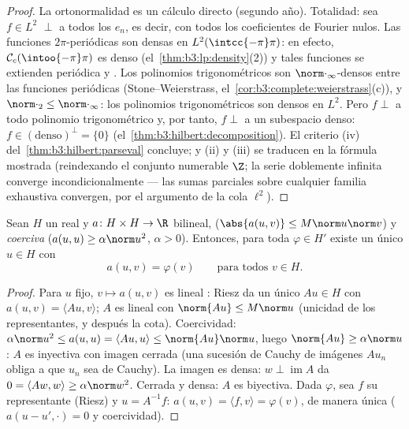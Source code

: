 \begin{proof}
La ortonormalidad es un cálculo directo (segundo año). Totalidad: sea
$f \in L^2$ $\perp$ a todos los $e_n$, es decir, con todos los
coeficientes de Fourier nulos. Las funciones $2\pi$-periódicas
 son densas en
$L^2(\intcc{-\pi}\pi)$: en efecto, $\mathcal
C_c(\intoo{-\pi}\pi)$ es denso (el~\cref{thm:b3:lp:density}(2)) y tales
funciones se extienden periódica y
. Los polinomios
trigonométricos son $\norm\cdot_\infty$-densos entre las funciones
periódicas 
(Stone--Weierstrass, el~\cref{cor:b3:complete:weierstrass}(c)), y
$\norm\cdot_2 \leq \norm\cdot_\infty$: los polinomios trigonométricos
son densos en $L^2$. Pero $f \perp$ a todo polinomio trigonométrico y,
por tanto, $f \perp$ a un subespacio denso: $f
\in (\text{denso})^\perp = \{0\}$
(el~\cref{thm:b3:hilbert:decomposition}). El criterio (iv)
del~\cref{thm:b3:hilbert:parseval} concluye; y (ii) y (iii) se traducen
en la fórmula mostrada (reindexando el conjunto numerable $\Z$; la serie
doblemente infinita converge incondicionalmente --- las sumas parciales
sobre cualquier familia exhaustiva convergen, por el argumento de la
cola $\ell^2$).
\end{proof}

\begin{theorem}\label{thm:b3:hilbert:laxmilgram}
Sean $H$ un  real y
$a \colon H\times H \to
\R$ bilineal, \emph{}
($\abs{a(u,v)} \leq M\norm
u\norm v$) y \emph{coerciva} ($a(u, u) \geq \alpha\norm u^2$,
$\alpha > 0$). Entonces, para toda $\varphi \in H'$ existe un único
$u \in H$ con
\[
a(u, v) = \varphi(v) \qquad \text{para todos } v \in H .
\]
\end{theorem}

\begin{proof}
Para $u$ fijo, $v \mapsto a(u, v)$ es lineal
: Riesz da un único
$Au \in H$ con $a(u,v) = \langle Au,
v\rangle$; $A$ es lineal con $\norm{Au} \leq M\norm u$ (unicidad de los
representantes, y después la cota). Coercividad:
$\alpha\norm u^2 \leq a(u,u) = \langle Au, u\rangle \leq
\norm{Au}\norm u$, luego $\norm{Au} \geq \alpha\norm u$: $A$ es
inyectiva con imagen cerrada (una sucesión de Cauchy de imágenes $Au_n$
obliga a que $u_n$ sea de Cauchy). La imagen es densa: $w \perp
\operatorname{im}A$ da $0 = \langle Aw, w\rangle \geq
\alpha\norm w^2$. Cerrada y densa: $A$ es biyectiva. Dada $\varphi$, sea
$f$ su representante (Riesz) y $u = A^{-1}f$:
$a(u, v) = \langle f, v\rangle = \varphi(v)$, de manera única
($a(u - u', \cdot) = 0$ y coercividad).
\end{proof}

